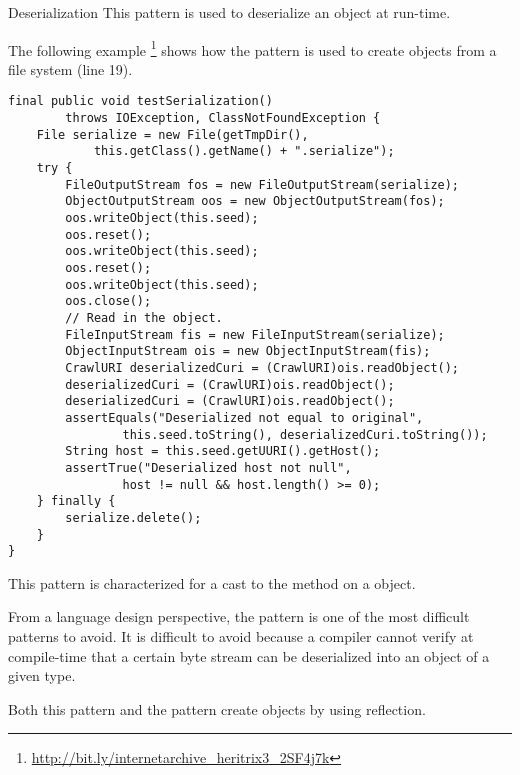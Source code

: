 \begin{pattern}{Deserialization}
This pattern is used to deserialize an object at run-time.

\instances{}
The following example%
\footnote{\url{http://bit.ly/internetarchive_heritrix3_2SF4j7k}}
shows how the \thisp{} pattern is used to create objects from a file system (line 19).

\begin{verbatim}
final public void testSerialization()
        throws IOException, ClassNotFoundException {
    File serialize = new File(getTmpDir(),
            this.getClass().getName() + ".serialize");
    try {
        FileOutputStream fos = new FileOutputStream(serialize);
        ObjectOutputStream oos = new ObjectOutputStream(fos);
        oos.writeObject(this.seed);
        oos.reset();
        oos.writeObject(this.seed);
        oos.reset();
        oos.writeObject(this.seed);
        oos.close();
        // Read in the object.
        FileInputStream fis = new FileInputStream(serialize);
        ObjectInputStream ois = new ObjectInputStream(fis);
        CrawlURI deserializedCuri = (CrawlURI)ois.readObject();
        deserializedCuri = (CrawlURI)ois.readObject();
        deserializedCuri = (CrawlURI)ois.readObject();
        assertEquals("Deserialized not equal to original",
                this.seed.toString(), deserializedCuri.toString());
        String host = this.seed.getUURI().getHost();
        assertTrue("Deserialized host not null",
                host != null && host.length() >= 0);
    } finally {
        serialize.delete();
    }
}
\end{verbatim}

\detection{}
This pattern is characterized for a cast to the  method on a  object.

\discussion{}
From a language design perspective,
the \thisp{} pattern is one of the most difficult patterns to avoid.
It is difficult to avoid because a compiler cannot verify at compile-time that a certain byte stream can be deserialized into an object of a given type.

\related{}
Both this pattern and the  pattern create objects by using reflection.

\end{pattern}